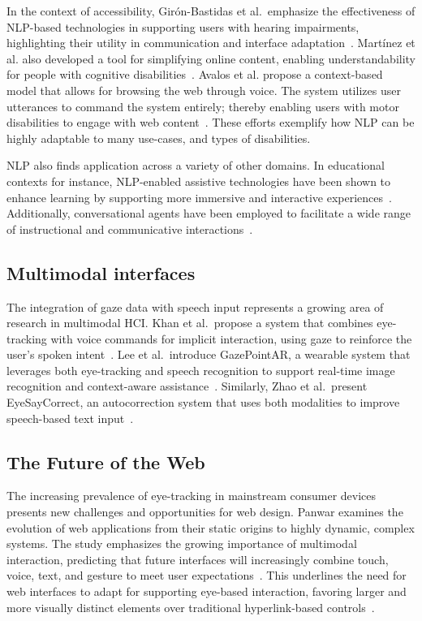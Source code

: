 In the context of accessibility, Girón-Bastidas et al.\ emphasize the effectiveness of NLP-based technologies in supporting users with hearing impairments, highlighting their utility in communication and interface adaptation~\cite{gironbastidas2019nlp}. Martínez et al. also developed a tool for simplifying online content, enabling understandability for people with cognitive disabilities~\cite{martinez2024tool}. Avalos et al. propose a context-based model that allows for browsing the web through voice. The system utilizes user utterances to command the system entirely; thereby enabling users with motor disabilities to engage with web content~\cite{avalos2025context}. These efforts exemplify how NLP can be highly adaptable to many use-cases, and types of disabilities.

NLP also finds application across a variety of other domains. In educational contexts for instance, NLP-enabled assistive technologies have been shown to enhance learning by supporting more immersive and interactive experiences~\cite{terzopoulos2020voice}. Additionally, conversational agents have been employed to facilitate a wide range of instructional and communicative interactions~\cite{liu2024chatgpt}.

\subsection{Multimodal interfaces}

The integration of gaze data with speech input represents a growing area of research in multimodal HCI. Khan et al.\ propose a system that combines eye-tracking with voice commands for implicit interaction, using gaze to reinforce the user's spoken intent~\cite{khan2022integrating}. Lee et al.\ introduce GazePointAR, a wearable system that leverages both eye-tracking and speech recognition to support real-time image recognition and context-aware assistance~\cite{lee2024gazepointar}. Similarly, Zhao et al.\ present EyeSayCorrect, an autocorrection system that uses both modalities to improve speech-based text input~\cite{zhao2022eyesaycorrect}.

\subsection{The Future of the Web}

The increasing prevalence of eye-tracking in mainstream consumer devices presents new challenges and opportunities for web design. Panwar examines the evolution of web applications from their static origins to highly dynamic, complex systems. The study emphasizes the growing importance of multimodal interaction, predicting that future interfaces will increasingly combine touch, voice, text, and gesture to meet user expectations~\cite{panwar2024webevolution}. This underlines the need for web interfaces to adapt for supporting eye-based interaction, favoring larger and more visually distinct elements over traditional hyperlink-based controls~\cite{apple2024spatialweb}.


